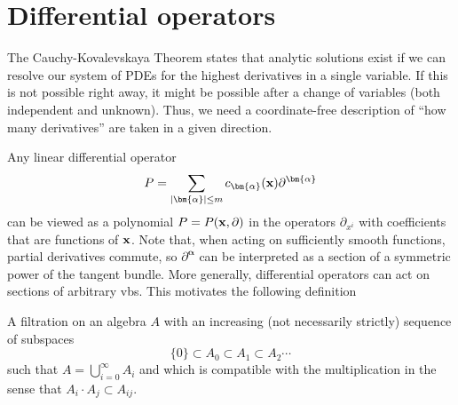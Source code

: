 \section{Differential operators}\label{sec: diff operators}


The Cauchy-Kovalevskaya Theorem states that analytic solutions exist if we can resolve our system of PDEs for the highest derivatives in a single variable. If this is not possible right away, it might be possible after a change of variables (both independent and unknown). Thus, we need a coordinate-free description of ``how many derivatives'' are taken in a given direction.

Any linear differential operator 
\[P=\sum_{|\bm{\alpha}|\leq m}c_{\bm{\alpha}}(\bf{x})\partial^{\bm{\alpha}}\]
can be viewed as a polynomial $P=P(\bf{x},\partial)$ in the operators $\partial_{x^i}$ with coefficients that are functions of $\bf{x}$. Note that, when acting on sufficiently smooth functions, partial derivatives commute, so $\partial^{\bm{\alpha}}$ can be interpreted as a section of a symmetric power of the tangent bundle. More generally, differential operators can act on sections of arbitrary \glspl{vb}. This motivates the following definition 

\begin{defn}
    A filtration on an algebra $A$ with an increasing (not necessarily strictly) sequence of subspaces 
    \[\{0\}\subset A_0\subset A_1\subset A_2\cdots \]
    such that $A=\bigcup_{i=0}^\infty A_i$ and which is compatible with the multiplication in the sense that $A_i\cdot A_j\subset A_{ij}$.
\end{defn}

